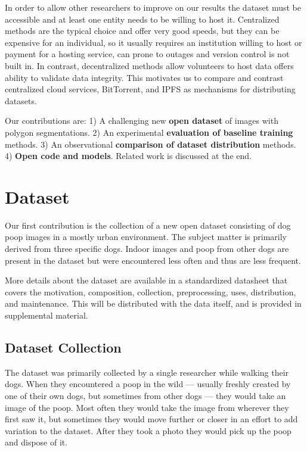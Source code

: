 \documentclass[10pt,twocolumn,letterpaper]{article}
\begin{document}
In order to allow other researchers to improve on our results the dataset must
be accessible and at least one entity needs to be willing to host it.
Centralized methods are the typical choice and offer very good speeds, 
but they can be expensive for an individual, so it usually requires an
institution willing to host or payment for a hosting service,
can prone to outages and version control is not built in.
In contrast, decentralized methods allow volunteers to host data offers ability
to validate data integrity. 
This motivates us to compare and contrast centralized cloud services,
BitTorrent, and IPFS as mechanisms for distributing datasets.



Our contributions are:
1) A challenging new \textbf{open dataset} of images with polygon segmentations.
2) An experimental \textbf{evaluation of baseline training} methods.
3) An observational \textbf{comparison of dataset distribution} methods.
4) \textbf{Open code and models}.
Related work is discussed at the end.


\section{Dataset}

Our first contribution is the collection of a new open dataset consisting of
dog poop images in a mostly urban environment. The subject matter is primarily
derived from three specific dogs. Indoor images and poop from other dogs are
present in the dataset but were encountered less often and thus are less
frequent.

More details about the dataset are available in a standardized datasheet
\cite{gebru_datasheets_2021} that covers the motivation, composition,
collection, preprocessing, uses, distribution, and maintenance. This will be
distributed with the data itself, and is provided in supplemental material.

\subsection{Dataset Collection}

The dataset was primarily collected by a single researcher while walking their
dogs. When they encountered a poop in the wild --- usually freshly created by
one of their own dogs, but sometimes from other dogs --- they would take an
image of the poop. Most often they would take the image from wherever they
first saw it, but sometimes they would move further or closer in an effort to
add variation to the dataset. After they took a photo they would pick up the
poop and dispose of it.
\end{document}

